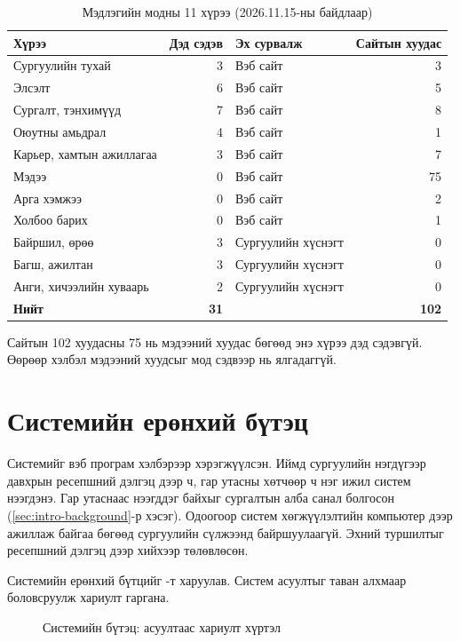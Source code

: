 \begin{table}[H]
\centering
\caption{Мэдлэгийн модны 11 хүрээ (2026.11.15-ны байдлаар)}
\label{tab:tree}
\begin{tabular}{|p{4.6cm}|r|p{4.4cm}|r|}
\hline
\textbf{Хүрээ} & \textbf{Дэд сэдэв} & \textbf{Эх сурвалж} & \textbf{Сайтын хуудас} \\
\hline
Сургуулийн тухай & 3 & Вэб сайт & 3 \\
\hline
Элсэлт & 6 & Вэб сайт & 5 \\
\hline
Сургалт, тэнхимүүд & 7 & Вэб сайт & 8 \\
\hline
Оюутны амьдрал & 4 & Вэб сайт & 1 \\
\hline
Карьер, хамтын ажиллагаа & 3 & Вэб сайт & 7 \\
\hline
Мэдээ & 0 & Вэб сайт & 75 \\
\hline
Арга хэмжээ & 0 & Вэб сайт & 2 \\
\hline
Холбоо барих & 0 & Вэб сайт & 1 \\
\hline
Байршил, өрөө & 3 & Сургуулийн хүснэгт & 0 \\
\hline
Багш, ажилтан & 3 & Сургуулийн хүснэгт & 0 \\
\hline
Анги, хичээлийн хуваарь & 2 & Сургуулийн хүснэгт & 0 \\
\hline
\textbf{Нийт} & \textbf{31} & & \textbf{102} \\
\hline
\end{tabular}
\end{table}

Сайтын 102 хуудасны 75 нь мэдээний хуудас бөгөөд энэ хүрээ дэд сэдэвгүй. Өөрөөр хэлбэл мэдээний хуудсыг мод сэдвээр нь ялгадаггүй.

\section{Системийн ерөнхий бүтэц}
\label{sec:system}

Системийг вэб програм хэлбэрээр хэрэгжүүлсэн. Иймд сургуулийн нэгдүгээр давхрын ресепшний дэлгэц дээр ч, гар утасны хөтчөөр ч нэг ижил систем нээгдэнэ. Гар утаснаас нээгддэг байхыг сургалтын алба санал болгосон (\ref{sec:intro-background}-р хэсэг). Одоогоор систем хөгжүүлэлтийн компьютер дээр ажиллаж байгаа бөгөөд сургуулийн сүлжээнд байршуулаагүй. Эхний туршилтыг ресепшний дэлгэц дээр хийхээр төлөвлөсөн.

Системийн ерөнхий бүтцийг -т харуулав. Систем асуултыг таван алхмаар боловсруулж хариулт гаргана.

\begin{figure}[ht]
\centering
{}
\caption{Системийн бүтэц: асуултаас хариулт хүртэл}
\label{fig:system}
\end{figure}

